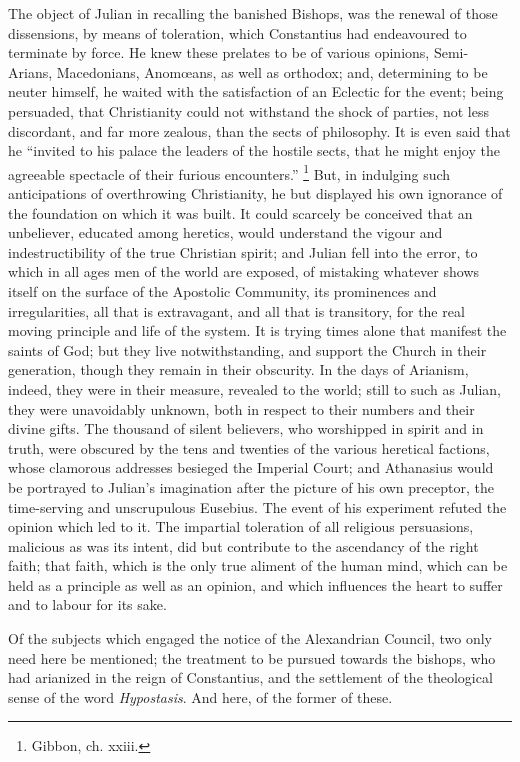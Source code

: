 The object of Julian in recalling the banished Bishops, was the
renewal of those dissensions, by means of toleration, which
Constantius had endeavoured to terminate by force. He knew these
prelates to be of various opinions, Semi-Arians, Macedonians, Anomœans,
as well as orthodox; and, determining to be neuter himself, he waited
with the satisfaction of an Eclectic for the event; being persuaded,
that Christianity could not withstand the shock of parties, not less
discordant, and far more zealous, than the sects of philosophy. It is
even said that he ``invited to his palace the leaders of the
hostile sects, that he might enjoy the agreeable spectacle of their
furious encounters.'' \footnote{Gibbon, ch. xxiii.}
But, in indulging such anticipations of overthrowing Christianity, he
but displayed his own ignorance of the foundation on which it was
built. It could scarcely be conceived that an unbeliever, educated
among heretics, would understand the vigour and indestructibility of
the true Christian spirit; and Julian fell into the error, to which in
all ages men of the world are exposed, of mistaking whatever shows
itself on the surface of the Apostolic Community, its
prominences and irregularities, all that is extravagant, and all that
is transitory, for the real moving principle and life of the system.
It is trying times alone that manifest the saints of God; but they
live notwithstanding, and support the Church in their generation,
though they remain in their obscurity. In the days of Arianism,
indeed, they were in their measure, revealed to the world; still to
such as Julian, they were unavoidably unknown, both in respect to
their numbers and their divine gifts. The thousand of silent
believers, who worshipped in spirit and in truth, were obscured by the
tens and twenties of the various heretical factions, whose clamorous
addresses besieged the Imperial Court; and Athanasius would be
portrayed to Julian's imagination after the picture of his own
preceptor, the time-serving and unscrupulous Eusebius. The event of
his experiment refuted the opinion which led to it. The impartial
toleration of all religious persuasions, malicious as was its intent,
did but contribute to the ascendancy of the right faith; that faith,
which is the only true aliment of the human mind, which can be held as
a principle as well as an opinion, and which influences the heart to
suffer and to labour for its sake.

Of the subjects which engaged the notice of the Alexandrian
Council, two only need here be mentioned; the treatment to be pursued
towards the bishops, who had arianized in the reign of Constantius,
and the settlement of the theological sense of the word \emph{Hypostasis}.
And here, of the former of these.

